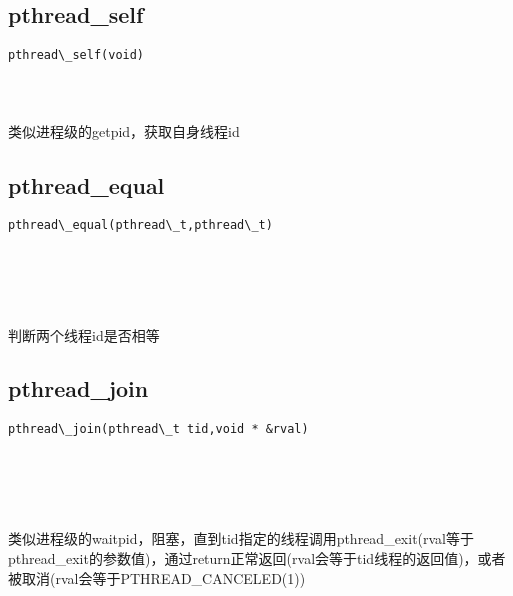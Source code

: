 \documentclass[10pt,a4paper]{article}
\begin{document}
\subsection{pthread\_self}
\begin{spacing}{2.0}
\lstset{language=C,numbers=none}
\begin{lstlisting}
pthread\_self(void)
\end{lstlisting}
{\large\color[rgb]{0.2,0.4,0.6}{void:}}
\paragraph{ \ \ }类似进程级的getpid，获取自身线程id
\end{spacing}

\subsection{pthread\_equal}
\begin{spacing}{2.0}
\lstset{language=C,numbers=none}
\begin{lstlisting}
pthread\_equal(pthread\_t,pthread\_t)
\end{lstlisting}
{\large\color[rgb]{0.2,0.4,0.6}{pthread\_t:}} \\
{\large\color[rgb]{0.2,0.4,0.6}{pthread\_t:}}
\paragraph{ \ \ }判断两个线程id是否相等
\end{spacing}

\subsection{pthread\_join}
\begin{spacing}{2.0}
\lstset{language=C,numbers=none}
\begin{lstlisting}
pthread\_join(pthread\_t tid,void * &rval)
\end{lstlisting}
{\large\color[rgb]{0.2,0.4,0.6}{tid:}} \\
{\large\color[rgb]{0.2,0.4,0.6}{\&rval:}}
\paragraph{ \ \ }类似进程级的waitpid，阻塞，直到tid指定的线程调用pthread\_exit(rval等于pthread\_exit的参数值)，通过return正常返回(rval会等于tid线程的返回值)，或者被取消(rval会等于PTHREAD\_CANCELED(1))
\end{spacing}
\end{document}
